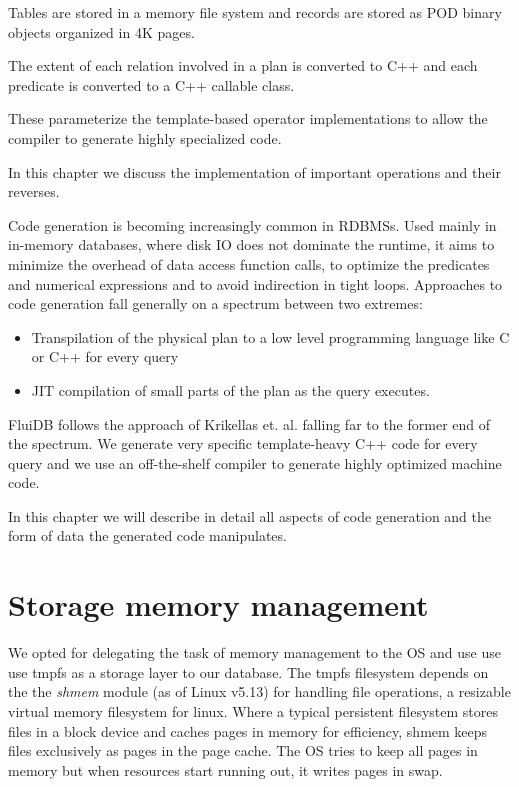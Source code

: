 
\begin{summary}
\item Tables are stored in a memory file system and records are
  stored as POD binary objects organized in 4K pages.
\item The extent of each relation involved in a plan is converted to
  C++  and each predicate is converted to a C++ callable
  class.
\item These parameterize the template-based operator implementations to allow the
  compiler to generate highly specialized code.
\item In this chapter we discuss the implementation of important
  operations and their reverses.
\end{summary}

Code generation is becoming increasingly common in RDBMSs. Used
mainly in in-memory databases, where disk IO does not dominate the
runtime, it aims to minimize the overhead of data access function
calls, to optimize the predicates and numerical expressions and to
avoid indirection in tight loops. Approaches to code generation fall
generally on a spectrum between two extremes:

\begin{itemize}
\item Transpilation of the physical plan to a low level programming
  language like C or C++ for every query
\item JIT compilation of small parts of the plan as the query
  executes.
\end{itemize}

FluiDB follows the approach of Krikellas
et. al. \cite{krikellasGeneratingCodeHolistic2010} falling far to the
former end of the spectrum. We generate very specific template-heavy
C++ code for every query and we use an off-the-shelf compiler to
generate highly optimized machine code.

In this chapter we will describe in detail all aspects of code generation and
the form of data the generated code manipulates.

\section{Storage memory management}

We opted for delegating the task of memory management to the OS and use use use tmpfs
as a storage layer to our database. The tmpfs filesystem depends on
the the \emph{shmem} module (as of Linux v5.13) for handling file
operations, a resizable virtual memory filesystem for
linux. Where a typical persistent filesystem stores files in a block
device and caches pages in memory for efficiency, shmem keeps files
exclusively as pages in the page cache. The OS tries to keep all pages
in memory but when resources start running out, it writes pages in
swap.

